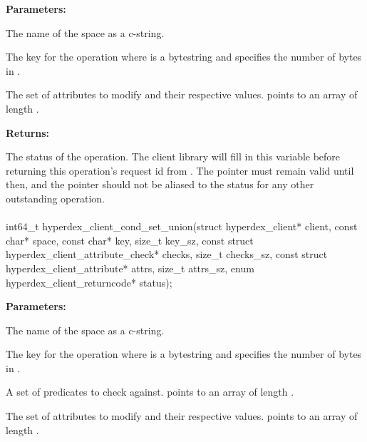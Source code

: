 \noindent\textbf{Parameters:}
\begin{description}[labelindent=\widthof{{\code{attrs}, \code{attrs\_sz}}},leftmargin=*,noitemsep,nolistsep,align=right]
\item[\code{space}] The name of the space as a c-string.
\item[\code{key}, \code{key\_sz}] The key for the operation where  is a bytestring and  specifies the number of bytes in .
\item[\code{attrs}, \code{attrs\_sz}] The set of attributes to modify and their respective values.   points to an array of length .
\end{description}

\noindent\textbf{Returns:}
\begin{description}[labelindent=\widthof{{\code{status}}},leftmargin=*,noitemsep,nolistsep,align=right]
\item[\code{status}] The status of the operation.  The client library will fill in this variable before returning this operation's request id from .  The pointer must remain valid until then, and the pointer should not be aliased to the status for any other outstanding operation.
\end{description}

\paragraph{}
\begin{ccode}
int64_t hyperdex_client_cond_set_union(struct hyperdex_client* client,
                const char* space,
                const char* key, size_t key_sz,
                const struct hyperdex_client_attribute_check* checks, size_t checks_sz,
                const struct hyperdex_client_attribute* attrs, size_t attrs_sz,
                enum hyperdex_client_returncode* status);
\end{ccode}
\funcdesc 

\noindent\textbf{Parameters:}
\begin{description}[labelindent=\widthof{{\code{checks}, \code{checks\_sz}}},leftmargin=*,noitemsep,nolistsep,align=right]
\item[\code{space}] The name of the space as a c-string.
\item[\code{key}, \code{key\_sz}] The key for the operation where  is a bytestring and  specifies the number of bytes in .
\item[\code{checks}, \code{checks\_sz}] A set of predicates to check against.   points to an array of length .
\item[\code{attrs}, \code{attrs\_sz}] The set of attributes to modify and their respective values.   points to an array of length .
\end{description}

